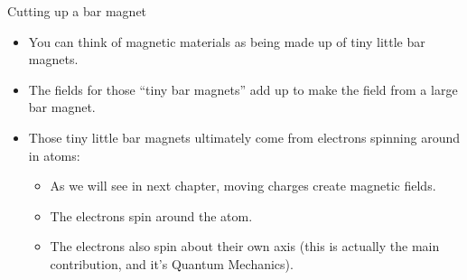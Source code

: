\documentclass[aspectratio=169,
hyperref={colorlinks,urlcolor=blue}
]{beamer}
\begin{document}
\begin{frame}{Cutting up a bar magnet}

\centering
{}%
%
\end{frame}


{
\begin{itemize}
\item You can think of magnetic materials as being made up of tiny little bar magnets.
\item The fields for those ``tiny bar magnets'' add up to make the field from a large bar magnet.
\item Those tiny little bar magnets ultimately come from electrons spinning around in atoms:
\begin{itemize}
\item As we will see in next chapter, moving charges create magnetic fields.
\item The electrons spin around the atom.
\item The electrons also spin about their own axis (this is actually the main contribution, and it's Quantum Mechanics).
\end{itemize}
\end{itemize}
}
{
\vspace{-1.2cm}
\vspace{-0.5cm}
}



\end{document}
